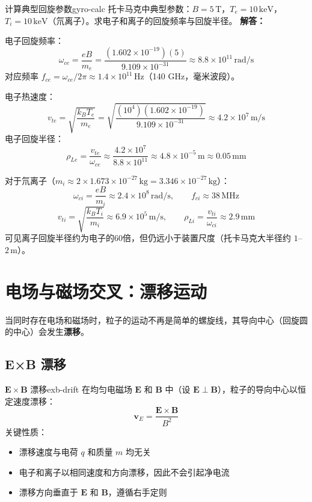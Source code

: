 \documentclass[12pt,a4paper,openany,oneside]{book}
\newcommand{\vect}[1]{\bm{#1}}
\newcommand{\difficulty}[1]{\marginnote{\hfill\textcolor{coverMid!80}{\rule[-0.1em]{2pt}{0.9em}}\,\textcolor{coverMid}{\footnotesize\textbf{[#1]}}}}
\begin{document}
\begin{example}{计算典型回旋参数}{gyro-calc}
\difficulty{基础}
托卡马克中典型参数：$B = 5\,\mathrm{T}$，$T_e = 10\,\mathrm{keV}$，$T_i = 10\,\mathrm{keV}$（氘离子）。求电子和离子的回旋频率与回旋半径。
\tcblower
\textbf{解答：}

电子回旋频率：
\[
\omega_{ce} = \frac{eB}{m_e} = \frac{(1.602\times 10^{-19})(5)}{9.109\times 10^{-31}} \approx 8.8\times 10^{11}\,\mathrm{rad/s}
\]
对应频率 $f_{ce} = \omega_{ce}/2\pi \approx 1.4\times 10^{11}\,\mathrm{Hz}$（140 GHz，毫米波段）。

电子热速度：
\[
v_{te} = \sqrt{\frac{k_B T_e}{m_e}} = \sqrt{\frac{(10^4)(1.602\times 10^{-19})}{9.109\times 10^{-31}}} \approx 4.2\times 10^{7}\,\mathrm{m/s}
\]
电子回旋半径：
\[
\rho_{Le} = \frac{v_{te}}{\omega_{ce}} \approx \frac{4.2\times 10^7}{8.8\times 10^{11}} \approx 4.8\times 10^{-5}\,\mathrm{m} \approx 0.05\,\mathrm{mm}
\]

对于氘离子（$m_i \approx 2\times 1.673\times 10^{-27}\,\mathrm{kg} = 3.346\times 10^{-27}\,\mathrm{kg}$）：
\[
\omega_{ci} = \frac{eB}{m_i} \approx 2.4\times 10^{8}\,\mathrm{rad/s}, \qquad f_{ci} \approx 38\,\mathrm{MHz}
\]
\[
v_{ti} = \sqrt{\frac{k_B T_i}{m_i}} \approx 6.9\times 10^{5}\,\mathrm{m/s}, \qquad \rho_{Li} = \frac{v_{ti}}{\omega_{ci}} \approx 2.9\,\mathrm{mm}
\]
可见离子回旋半径约为电子的60倍，但仍远小于装置尺度（托卡马克大半径约 $1$--$2\,\mathrm{m}$）。
\end{example}

\section{电场与磁场交叉：漂移运动}\difficulty{基础}

当同时存在电场和磁场时，粒子的运动不再是简单的螺旋线，其导向中心（回旋圆的中心）会发生\textbf{漂移}。

\subsection{E×B 漂移}\label{sec:exb-drift}

\begin{theorem}{$\vect{E}\times\vect{B}$ 漂移}{exb-drift}
在均匀电磁场 $\vect{E}$ 和 $\vect{B}$ 中（设 $\vect{E}\perp\vect{B}$），粒子的导向中心以恒定速度漂移：
\[
\vect{v}_E = \frac{\vect{E}\times\vect{B}}{B^2}
\]
关键性质：
\begin{itemize}
\item 漂移速度与电荷 $q$ 和质量 $m$ 均无关
\item 电子和离子以相同速度和方向漂移，因此不会引起净电流
\item 漂移方向垂直于 $\vect{E}$ 和 $\vect{B}$，遵循右手定则
\end{itemize}
\end{theorem}
\end{document}
